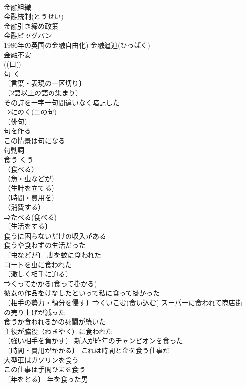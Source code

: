 \documentclass[8pt]{extreport}
\begin{document}
\begin{CJK}{UTF8}{min}
\\	金融組織 
\\	金融統制(とうせい) 
\\	金融引き締め政策 
\\	金融ビッグバン 
\\	1986年の英国の金融自由化) 金融逼迫(ひっぱく) 
\\	金融不安 
\\	((口)) 
\\	句	く	
\\	〔言葉・表現の一区切り〕
\\	〔2語以上の語の集まり〕
\\	その詩を一字一句間違いなく暗記した 
\\	⇒にのく(二の句) 
\\	〔俳句〕
\\	句を作る 
\\	この情景は句になる 
\\	句動詞 
\\	食う	くう	
\\	（食べる）
\\	（魚・虫などが）
\\	（生計を立てる）
\\	（時間・費用を）
\\	（消費する）
\\	⇒たべる(食べる) 
\\	〔生活をする〕
\\	食うに困らないだけの収入がある 
\\	食うや食わずの生活だった 
\\	〔虫などが〕 脚を蚊に食われた 
\\	コートを虫に食われた 
\\	〔激しく相手に迫る〕
\\	⇒くってかかる(食って掛かる) 
\\	彼女の作品をけなしたといって私に食って掛かった 
\\	〔相手の勢力・領分を侵す〕⇒くいこむ(食い込む) スーパーに食われて商店街の売り上げが減った 
\\	食うか食われるかの死闘が続いた 
\\	主役が脇役（わきやく）に食われた 
\\	〔強い相手を負かす〕 新人が昨年のチャンピオンを食った 
\\	〔時間・費用がかかる〕 これは時間と金を食う仕事だ 
\\	大型車はガソリンを食う 
\\	この仕事は手間ひまを食う 
\\	〔年をとる〕 年を食った男 

\end{CJK}
\end{document}
